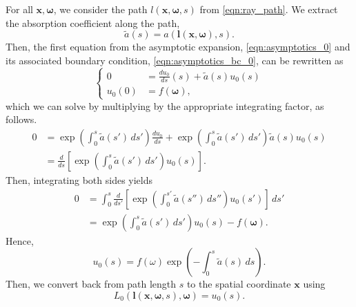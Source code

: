 \documentclass[ms,cpyr,lof,lot]{uathesis}
\renewcommand\vec\bm
\begin{document}
For all $\vec{x}, \vec{\omega}$, we consider the path $l(\vec{x}, \vec{\omega}, s)$ from \eqref{eqn:ray_path}.
We extract the absorption coefficient along the path,
\begin{equation*}
  \tilde{a}(s) = a(\vec{l}(\vec{x}, \vec{\omega}), s).
\end{equation*}
Then, the first equation from the asymptotic expansion, \eqref{eqn:asymptotics_0} and its associated boundary condition, \eqref{eqn:asymptotics_bc_0}, can be rewritten as
\begin{equation*}
  \left\{
  \begin{aligned}
  0 &= \frac{du_0}{ds}(s) + \tilde{a}(s) u_0(s) \\
  u_0(0) &= f(\vec{\omega}),
  \end{aligned}
  \right.
\end{equation*}
which we can solve by multiplying by the appropriate integrating factor, as follows.
\begin{align*}
  0 &= \exp\left(\int_0^s \tilde{a}(s')\, ds'\right) \frac{du_0}{ds} + \exp\left(\int_0^s \tilde{a}(s')\, ds'\right) \tilde{a}(s) u_0(s) \\
  &= \frac{d}{ds}\left[\exp\left(\int_0^s \tilde{a}(s')\, ds'\right) u_0(s)\right].
\end{align*}
Then, integrating both sides yields
\begin{align*}
  0 &= \int_0^s \frac{d}{ds'}\left[\exp\left(\int_0^{s'} \tilde{a}(s'')\, ds''\right) u_0(s')\right]\, ds' \\
  &= \exp\left(\int_0^s \tilde{a}(s')\, ds'\right) u_0(s) - f(\vec{\omega}).
\end{align*}
Hence,
\begin{equation}
  u_0(s) = f(\omega) \exp\left(-\int_0^s \tilde{a}(s)\, ds\right).
  \label{eqn:asymptotics_soln_0}
\end{equation}
Then, we convert back from path length $s$ to the spatial coordinate $\vec{x}$ using
\begin{equation*}
  L_0(\vec{l}(\vec{x}, \vec{\omega},s), \vec{\omega}) = u_0(s).
\end{equation*}
\end{document}
